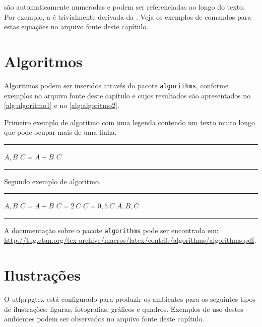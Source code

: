 \noindent são automaticamente numeradas e podem ser referenciadas ao longo do texto. Por exemplo, a  é trivialmente derivada da . Veja os exemplos de comandos para estas equações no arquivo fonte deste capítulo.

\section{Algoritmos}\label{sec:algoritmos}

Algoritmos podem ser inseridos através do pacote \texttt{algorithms}, conforme exemplos no arquivo fonte deste capítulo e cujos resultados são apresentados no \autoref{alg:algoritmo1} e no \autoref{alg:algoritmo2}.

\begin{algorithm}[htb]%
\caption{Primeiro exemplo de algoritmo com uma legenda contendo um texto muito longo que pode ocupar mais de uma linha.}%
\label{alg:algoritmo1}%
\hrule
\begin{algorithmic}[1]%
\ENSURE $A, B$
\STATE $C = A + B$
\PRINT $C$
\end{algorithmic}
\hrule
{}%
\end{algorithm}

\begin{algorithm}[htb]%
\caption{Segundo exemplo de algoritmo.}%
\label{alg:algoritmo2}%
\hrule
\begin{algorithmic}[1]%
\ENSURE $A, B$
\STATE $C = A + B$
\STATE $C = 2 \ C$
\ELSE
\STATE $C = 0,5 \ C$
\ENDIF
\PRINT $A, B, C$
\end{algorithmic}
\hrule
{}%
\end{algorithm}

A documentação sobre o pacote \texttt{algorithms} pode ser encontrada em: \url{http://tug.ctan.org/tex-archive/macros/latex/contrib/algorithms/algorithms.pdf}.

\section{Ilustrações}\label{sec:ilustracoes}

O \gls{utfprpgtex} está configurado para produzir os ambientes para os seguintes tipos de ilustrações: figuras, fotografias, gráficos e quadros. Exemplos de uso destes ambientes podem ser observados no arquivo fonte deste capítulo.

